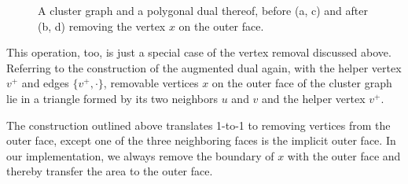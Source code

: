 \begin{figure}[H]
	\centering
	\quad
	\qquad
	\quad
	\caption{A cluster graph and a polygonal dual thereof, before (a, c) and after (b, d) removing the vertex $x$ on the outer face.}
	\label{fig:remove-vertex-example-external}
\end{figure}

This operation, too, is just a special case of the vertex removal discussed above. Referring to the construction of the augmented dual again, with the helper vertex $v^+$ and edges $\{v^+,\cdot\}$, removable vertices $x$ on the outer face of the cluster graph lie in a triangle formed by its two neighbors $u$ and $v$ and the helper vertex $v^+$.

The construction outlined above translates 1-to-1 to removing vertices from the outer face, except one of the three neighboring faces is the implicit outer face. In our implementation, we always remove the boundary of $x$ with the outer face and thereby transfer the area to the outer face.
